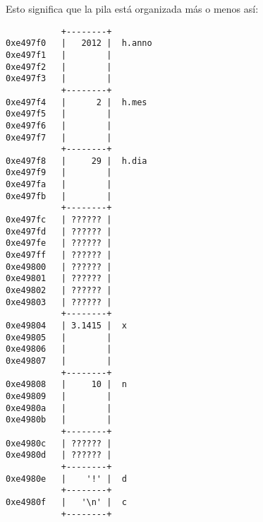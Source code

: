Esto significa que la pila está organizada más o menos así:

\begin{verbatim}
           +--------+
0xe497f0   |   2012 |  h.anno
0xe497f1   |        |
0xe497f2   |        |
0xe497f3   |        |
           +--------+
0xe497f4   |      2 |  h.mes
0xe497f5   |        |
0xe497f6   |        |
0xe497f7   |        |
           +--------+
0xe497f8   |     29 |  h.dia
0xe497f9   |        |
0xe497fa   |        |
0xe497fb   |        |
           +--------+
0xe497fc   | ?????? |
0xe497fd   | ?????? |
0xe497fe   | ?????? |
0xe497ff   | ?????? |
0xe49800   | ?????? |
0xe49801   | ?????? |
0xe49802   | ?????? |
0xe49803   | ?????? |
           +--------+
0xe49804   | 3.1415 |  x
0xe49805   |        |
0xe49806   |        |
0xe49807   |        |
           +--------+
0xe49808   |     10 |  n
0xe49809   |        |
0xe4980a   |        |
0xe4980b   |        |
           +--------+
0xe4980c   | ?????? |
0xe4980d   | ?????? |
           +--------+
0xe4980e   |    '!' |  d
           +--------+
0xe4980f   |   '\n' |  c
           +--------+
\end{verbatim}

